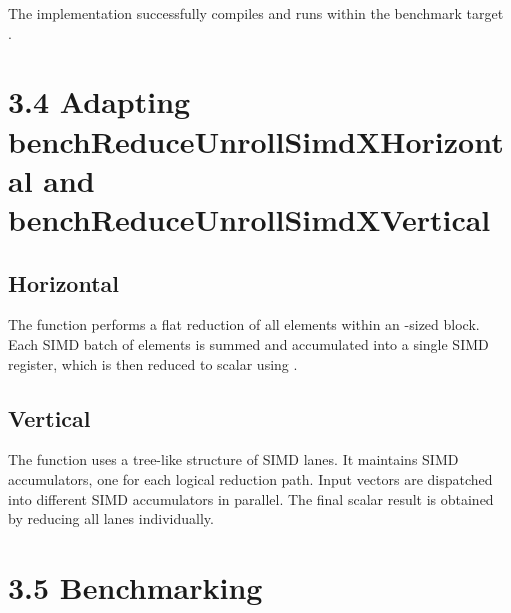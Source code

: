 The implementation successfully compiles and runs within the benchmark target \\
.

\pagebreak

\section*{3.4 Adapting benchReduceUnrollSimdXHorizontal and benchReduceUnrollSimdXVertical}

\subsection*{Horizontal}

The function  performs a flat reduction of all elements within an -sized block. 
Each SIMD batch of  elements is summed and accumulated into a single SIMD register, which is then reduced to scalar using .

\subsection*{Vertical}

The function  uses a tree-like structure of SIMD lanes. 
It maintains  SIMD accumulators, one for each logical reduction path. 
Input vectors are dispatched into different SIMD accumulators in parallel. The final scalar result is obtained by reducing all lanes individually.

\pagebreak

\section*{3.5 Benchmarking}




